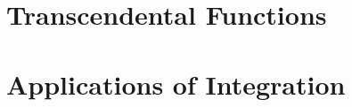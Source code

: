 \iflatetranscendentals
\chapter{Transcendental Functions}

\elselatetranscendentals
\chapter{Applications of Integration}











\filatetranscendentals
